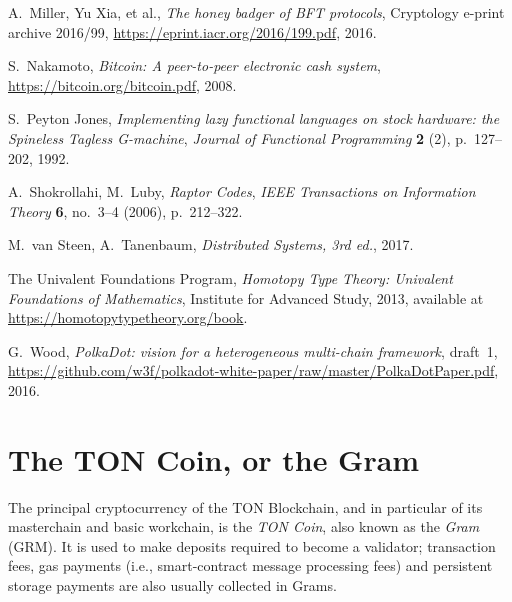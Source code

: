 \documentclass[12pt,oneside]{article}
\def\myappendix#1{\section{#1}\fancyhead[C]{\textsc{Appendix \textbf{\thesection.} #1}}}
\begin{document}
\begin{thebibliography}{2}
  {\sc A.~Miller, Yu Xia, et al.}, {\sl The honey badger of BFT protocols}, Cryptology e-print archive 2016/99, \url{https://eprint.iacr.org/2016/199.pdf}, 2016.

  {\sc S.~Nakamoto}, {\sl Bitcoin: A peer-to-peer electronic cash system}, \url{https://bitcoin.org/bitcoin.pdf}, 2008.

  {\sc S.~Peyton Jones}, {\sl Implementing lazy functional languages on stock hardware: the Spineless Tagless G-machine}, {\it Journal of Functional Programming\/} {\bf 2} (2), p.~127--202, 1992.

  {\sc A.~Shokrollahi, M.~Luby}, {\sl Raptor Codes}, {\it IEEE Transactions on Information Theory\/} {\bf 6}, no.\ 3--4 (2006), p.~212--322.

  {\sc M.~van Steen, A.~Tanenbaum}, {\sl Distributed Systems, 3rd ed.}, 2017.

  {\sc The Univalent Foundations Program}, {\sl Homotopy Type Theory: Univalent Foundations of Mathematics}, Institute for Advanced Study, 2013, available at \url{https://homotopytypetheory.org/book}.

  {\sc G.~Wood}, {\sl PolkaDot: vision for a heterogeneous multi-chain framework}, draft~1, \url{https://github.com/w3f/polkadot-white-paper/raw/master/PolkaDotPaper.pdf}, 2016.

\end{thebibliography}

%
%
%
%
\clearpage
\appendix
\myappendix{The TON Coin, or the Gram}\label{app:coins}

The principal cryptocurrency of the TON Blockchain, and in particular
of its masterchain and basic workchain, is the {\em TON Coin}, also
known as the {\em Gram\/} (GRM). It is used to make deposits required
to become a validator; transaction fees, gas payments (i.e.,
smart-contract message processing fees) and persistent storage
payments are also usually collected in Grams.
\end{document}

